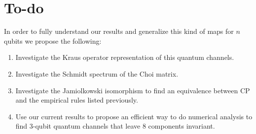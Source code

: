 \documentclass[11pt,dvipsnames]{article} %
\newcommand{\1}{\mathds{1}}
\begin{document}
\section*{To-do} %
In order to fully understand our results and generalize this kind of maps 
for $n$ qubits we propose the following:
\begin{enumerate}
\item Investigate the Kraus operator representation of this quantum channels.
\item Investigate the Schmidt spectrum of the Choi matrix.
\item Investigate the Jamiolkowski isomorphism to find an equivalence between
CP and the empirical rules listed previously.
\item Use our current results to propose an efficient way to do numerical
analysis to find 3-qubit quantum channels that leave 8 components invariant.
\end{enumerate}


\vfill
\end{document}
